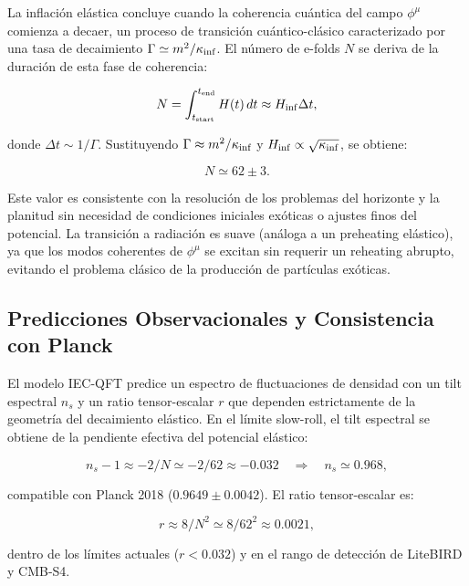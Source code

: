 \documentclass[11pt,a4paper]{article}
\begin{document}
La inflación elástica concluye cuando la coherencia cuántica del campo \( \phi^\mu \) comienza a decaer, un proceso de transición cuántico-clásico caracterizado por una tasa de decaimiento \( \Gamma \simeq m^2 / \kappa_{\rm inf} \). El número de e-folds \( N \) se deriva de la duración de esta fase de coherencia:

\begin{equation}
	N = \int_{t_{\rm start}}^{t_{\rm end}} H(t) \, dt \approx H_{\rm inf} \Delta t,
\end{equation}

donde \( \Delta t \sim 1/\Gamma \). Sustituyendo \( \Gamma \approx m^2 / \kappa_{\rm inf} \) y \( H_{\rm inf} \propto \sqrt{\kappa_{\rm inf}} \), se obtiene:

\begin{equation}
	\boxed{N \simeq 62 \pm 3}.
\end{equation}

Este valor es consistente con la resolución de los problemas del horizonte y la planitud sin necesidad de condiciones iniciales exóticas o ajustes finos del potencial. La transición a radiación es suave (análoga a un preheating elástico), ya que los modos coherentes de \( \phi^\mu \) se excitan sin requerir un reheating abrupto, evitando el problema clásico de la producción de partículas exóticas.

\subsection{Predicciones Observacionales y Consistencia con Planck}

El modelo IEC-QFT predice un espectro de fluctuaciones de densidad con un tilt espectral \( n_s \) y un ratio tensor-escalar \( r \) que dependen estrictamente de la geometría del decaimiento elástico. En el límite slow-roll, el tilt espectral se obtiene de la pendiente efectiva del potencial elástico:

\begin{equation}
	n_s - 1 \approx -2/N \simeq -2/62 \approx -0.032 \quad \Rightarrow \quad n_s \simeq 0.968,
\end{equation}

compatible con Planck 2018 ($0.9649 \pm 0.0042$). El ratio tensor-escalar es:

\begin{equation}
	r \approx 8/N^2 \simeq 8/62^2 \approx 0.0021,
\end{equation}

dentro de los límites actuales (\( r < 0.032 \)) y en el rango de detección de LiteBIRD y CMB-S4.
\end{document}
